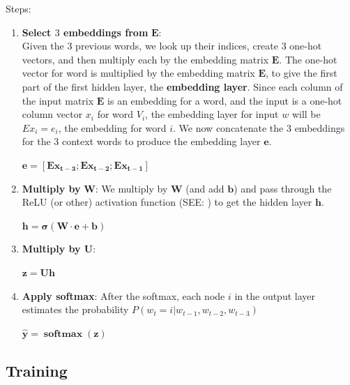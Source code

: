 \vspace{0.2cm}
Steps:
\begin{enumerate}
    \item \textbf{Select $3$ embeddings from} $\mathbf{E}$:\\
    Given the $3$ previous words, we look up their indices, create $3$ one-hot vectors, and then multiply each by the embedding matrix $\mathbf{E}$. The one-hot vector for word is multiplied by the embedding matrix $\mathbf{E}$, to give the first part of the first hidden layer, the \textbf{embedding layer}\label{embedding layer}. Since each column of the input matrix $\mathbf{E}$ is an embedding for a word, and the input is a one-hot column vector $x_i$ for word $V_i$, the embedding layer for input $w$ will be $Ex_i = e_i$, the embedding for word $i$. We now concatenate the 3 embeddings for the 3 context words to produce the embedding layer $\mathbf{e}$.
    \begin{center}
        \( \mathbf{e = [Ex_{t-3};Ex_{t-2};Ex_{t-1}]} \)
    \end{center}

    \item \textbf{Multiply by} $\mathbf{W}$: We multiply by $\mathbf{W}$ (and add $\mathbf{b}$) and pass through the ReLU (or other) activation function (SEE: ) to get the hidden layer $\mathbf{h}$.
    \begin{center}
        \(\mathbf{h = \sigma(W\cdot e+b)}\)
    \end{center}

    \item \textbf{Multiply by U}:
    \begin{center}
        \(\mathbf{z = Uh}\)
    \end{center}

    \item \textbf{Apply softmax}: After the softmax, each node $i$ in the output layer estimates the probability $P(w_t=i|w_{t-1},w_{t-2},w_{t-3})$
    \begin{center}
        \(\mathbf{\hat{y} = \operatorname{softmax}(z)}\)
    \end{center}
    
\end{enumerate}

\subsection{Training}

